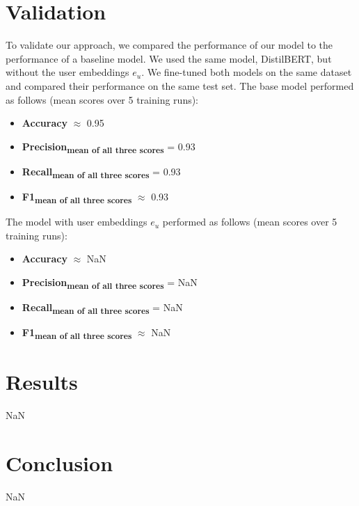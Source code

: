 \documentclass{article}
\begin{document}
\section{Validation}
To validate our approach, we compared the performance of our model to the performance of a baseline model. We used the same model, DistilBERT, but without the user embeddings $e_u$. We fine-tuned both models on the same dataset and compared their performance on the same test set. The base model performed as follows (mean scores over 5 training runs):
\begin{itemize} %
	\item \textbf{Accuracy} $\approx$ 0.95
	\item \textbf{Precision\textsubscript{\textnormal{mean of all three scores}}} = 0.93
	\item \textbf{Recall\textsubscript{\textnormal{mean of all three scores}}} = 0.93
	\item \textbf{F1\textsubscript{\textnormal{mean of all three scores}}} $\approx$ 0.93
\end{itemize}
The model with user embeddings $e_u$ performed as follows (mean scores over 5 training runs):
\begin{itemize}
	\item \textbf{Accuracy} $\approx$ NaN
	\item \textbf{Precision\textsubscript{\textnormal{mean of all three scores}}} = NaN
	\item \textbf{Recall\textsubscript{\textnormal{mean of all three scores}}} = NaN
	\item \textbf{F1\textsubscript{\textnormal{mean of all three scores}}} $\approx$ NaN
\end{itemize}
\section{Results}
NaN

\section{Conclusion}
NaN

\printbibliography

\end{document}
